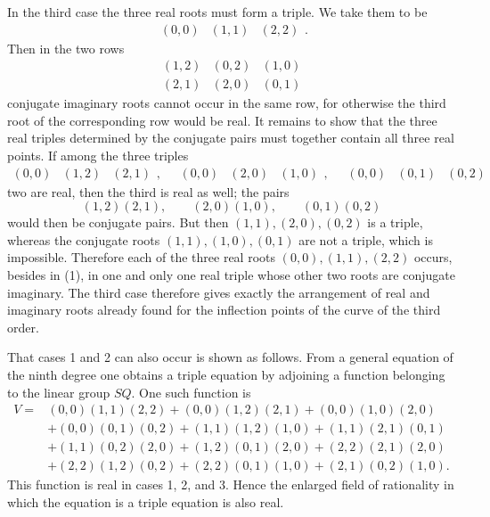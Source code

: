 \documentclass[11pt]{article}
\providecommand{\trip}[3]{\begin{array}{ccc}#1&#2&#3\end{array}}
\begin{document}
In the third case the three real roots must form a triple. We take them to be
\begin{equation}
 \trip{(0,0)}{(1,1)}{(2,2)}.
 \tag{1}
\end{equation}
Then in the two rows
\begin{equation}
\begin{array}{ccc}
(1,2)&(0,2)&(1,0)\\
(2,1)&(2,0)&(0,1)
\end{array}
\tag{2}
\end{equation}
conjugate imaginary roots cannot occur in the same row, for otherwise the third root of the corresponding row would be real. It remains to show that the three real triples determined by the conjugate pairs must together contain all three real points. If among the three triples
\[
\trip{(0,0)}{(1,2)}{(2,1)},
\quad
\trip{(0,0)}{(2,0)}{(1,0)},
\quad
\trip{(0,0)}{(0,1)}{(0,2)}
\]
two are real, then the third is real as well; the pairs
\[
(1,2)(2,1),
\qquad
(2,0)(1,0),
\qquad
(0,1)(0,2)
\]
would then be conjugate pairs. But then \((1,1),(2,0),(0,2)\) is a triple, whereas the conjugate roots \((1,1),(1,0),(0,1)\) are not a triple, which is impossible. Therefore each of the three real roots \((0,0),(1,1),(2,2)\) occurs, besides in (1), in one and only one real triple whose other two roots are conjugate imaginary. The third case therefore gives exactly the arrangement of real and imaginary roots already found for the inflection points of the curve of the third order.

That cases 1 and 2 can also occur is shown as follows. From a general equation of the ninth degree one obtains a triple equation by adjoining a function belonging to the linear group \(SQ\). One such function is
\begin{align*}
 V={}&(0,0)(1,1)(2,2)+(0,0)(1,2)(2,1)+(0,0)(1,0)(2,0)\\
 &+(0,0)(0,1)(0,2)+(1,1)(1,2)(1,0)+(1,1)(2,1)(0,1)\\
 &+(1,1)(0,2)(2,0)+(1,2)(0,1)(2,0)+(2,2)(2,1)(2,0)\\
 &+(2,2)(1,2)(0,2)+(2,2)(0,1)(1,0)+(2,1)(0,2)(1,0).
\end{align*}
This function is real in cases 1, 2, and 3. Hence the enlarged field of rationality in which the equation is a triple equation is also real.
\end{document}
